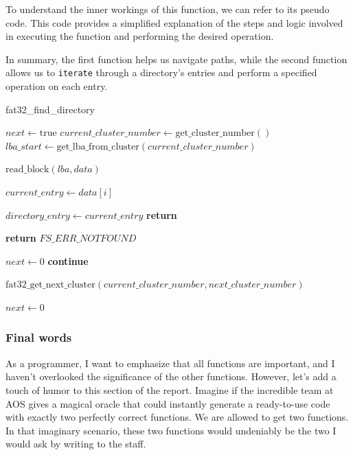 To understand the inner workings of this function, we can refer to its pseudo code. This code provides a simplified explanation of the steps and logic involved in executing the function and performing the desired operation.

In summary, the first function helps us navigate paths, while the second function allows us to \texttt{iterate} through a directory's entries and perform a specified operation on each entry.

\begin{algorithm}
\caption{fat32\_find\_directory}
\begin{algorithmic}[1]
    \State $next \gets \text{true}$
    \State $current\_cluster\_number \gets \text{get\_cluster\_number}()$
    \State $lba\_start \gets \text{get\_lba\_from\_cluster}(current\_cluster\_number)$

            \State $\text{read\_block}(lba, data)$

                \State $current\_entry \gets data[i]$

                    \State $directory\_entry \gets current\_entry$
                    \State \textbf{return}
                \EndIf

                    \State \textbf{return} $FS\_ERR\_NOTFOUND$
                \EndIf
            \EndFor
        \EndFor

            \State $next \gets 0$
            \State \textbf{continue}
        \EndIf

        \State $\text{fat32\_get\_next\_cluster}(current\_cluster\_number, next\_cluster\_number)$

            \State $next \gets 0$
        \EndIf
    \EndWhile
\EndProcedure
\end{algorithmic}
\end{algorithm}

 \subsubsection{Final words}

As a programmer, I want to emphasize that all functions are important, and I haven't overlooked the significance of the other functions. However, let's add a touch of humor to this section of the report. Imagine if the incredible team at AOS gives a magical oracle that could instantly generate a ready-to-use code with exactly two perfectly correct functions. We are allowed to get two functions. In that imaginary scenario, these two functions would undeniably be the two I would ask by writing to the staff.

